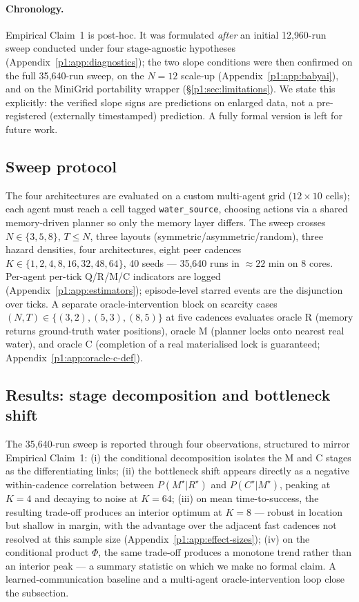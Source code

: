 \documentclass{article}
\begin{document}
\paragraph{Chronology.}
Empirical Claim~1 is post-hoc. It was formulated \emph{after} an initial 12{,}960-run sweep conducted under four stage-agnostic hypotheses (Appendix~\ref{p1:app:diagnostics}); the two slope conditions were then confirmed on the full 35{,}640-run sweep, on the $N\!=\!12$ scale-up (Appendix~\ref{p1:app:babyai}), and on the MiniGrid portability wrapper (\S\ref{p1:sec:limitations}). We state this explicitly: the verified slope signs are predictions on enlarged data, not a pre-registered (externally timestamped)
prediction. A fully formal version is left for future work.

\subsection{Sweep protocol}
\label{p1:sec:multi-agent-protocol}

The four architectures are evaluated on a custom multi-agent grid ($12{\times}10$ cells); each agent must reach a cell tagged \texttt{water\_source}, choosing actions via a shared memory-driven planner so only the memory layer differs. The sweep crosses $N{\in}\{3,5,8\}$, $T{\le}N$, three layouts (symmetric/asymmetric/random), three hazard densities, four architectures, eight peer cadences $K{\in}\{1,2,4,8,16,32,48,64\}$, 40 seeds --- 35{,}640 runs in $\approx 22$ min on 8 cores. Per-agent per-tick Q/R/M/C indicators are logged (Appendix~\ref{p1:app:estimators}); episode-level starred events are the disjunction over ticks. A separate oracle-intervention block on scarcity cases $(N,T){\in}\{(3,2),(5,3),(8,5)\}$ at five cadences evaluates oracle R (memory returns ground-truth water positions), oracle M (planner locks onto nearest real water), and oracle C (completion of a real materialised lock is guaranteed; Appendix~\ref{p1:app:oracle-c-def}).

\subsection{Results: stage decomposition and bottleneck shift}
\label{p1:sec:multi-agent-results}

The 35{,}640-run sweep is reported through four observations,
structured to mirror Empirical Claim~1: (i) the conditional
decomposition isolates the M and C stages as the differentiating
links; (ii) the bottleneck shift appears directly as a negative
within-cadence correlation between $P(M^\star|R^\star)$ and
$P(C^\star|M^\star)$, peaking at $K\!=\!4$ and decaying to noise at
$K\!=\!64$; (iii) on mean time-to-success, the resulting trade-off
produces an interior optimum at $K\!=\!8$ --- robust in location but shallow in margin, with the advantage over the adjacent fast cadences not resolved at this sample size (Appendix~\ref{p1:app:effect-sizes}); (iv) on the
conditional product $\Phi$, the same trade-off produces a monotone
trend rather than an interior peak --- a summary statistic on which we make no formal claim. A learned-communication baseline and a multi-agent
oracle-intervention loop close the subsection.
\end{document}
